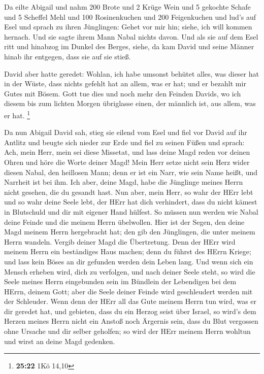  Da eilte Abigail und nahm 200 Brote und 2 Krüge Wein und 5
gekochte Schafe und 5 Scheffel Mehl und 100 Rosinenkuchen und 200
Feigenkuchen und lud's auf Esel  und sprach zu ihren
Jünglingen: Gehet vor mir hin; siehe, ich will kommen hernach. Und sie
sagte ihrem Mann Nabal nichts davon.  Und als sie auf dem
Esel ritt und hinabzog im Dunkel des Berges, siehe, da kam David und
seine Männer hinab ihr entgegen, dass sie auf sie stieß.

 David aber hatte geredet: Wohlan, ich habe umsonst behütet
alles, was dieser hat in der Wüste, dass nichts gefehlt hat an allem,
was er hat; und er bezahlt mir Gutes mit Bösem.  Gott tue
dies und noch mehr den Feinden Davids, wo ich diesem bis zum lichten
Morgen übriglasse einen, der männlich ist, aus allem, was er hat.
\footnote{\textbf{25:22} 1Kö 14,10}

 Da nun Abigail David sah, stieg sie eilend vom Esel und
fiel vor David auf ihr Antlitz und beugte sich nieder zur Erde
 und fiel zu seinen Füßen und sprach: Ach, mein Herr, mein
sei diese Missetat, und lass deine Magd reden vor deinen Ohren und höre
die Worte deiner Magd!  Mein Herr setze nicht sein Herz
wider diesen Nabal, den heillosen Mann; denn er ist ein Narr, wie sein
Name heißt, und Narrheit ist bei ihm. Ich aber, deine Magd, habe die
Jünglinge meines Herrn nicht gesehen, die du gesandt hast. 
Nun aber, mein Herr, so wahr der HErr lebt und so wahr deine Seele lebt,
der HErr hat dich verhindert, dass du nicht kämest in Blutschuld und dir
mit eigener Hand hülfest. So müssen nun werden wie Nabal deine Feinde
und die meinem Herrn übelwollen.  Hier ist der Segen, den
deine Magd meinem Herrn hergebracht hat; den gib den Jünglingen, die
unter meinem Herrn wandeln.  Vergib deiner Magd die
Übertretung. Denn der HErr wird meinem Herrn ein beständiges Haus
machen; denn du führst des HErrn Kriege; und lass kein Böses an dir
gefunden werden dein Leben lang.  Und wenn sich ein Mensch
erheben wird, dich zu verfolgen, und nach deiner Seele steht, so wird
die Seele meines Herrn eingebunden sein im Bündlein der Lebendigen bei
dem HErrn, deinem Gott; aber die Seele deiner Feinde wird geschleudert
werden mit der Schleuder.  Wenn denn der HErr all das Gute
meinem Herrn tun wird, was er dir geredet hat, und gebieten, dass du ein
Herzog seist über Israel,  so wird's dem Herzen meines
Herrn nicht ein Anstoß noch Ärgernis sein, dass du Blut vergossen ohne
Ursache und dir selber geholfen; so wird der HErr meinem Herrn wohltun
und wirst an deine Magd gedenken.

